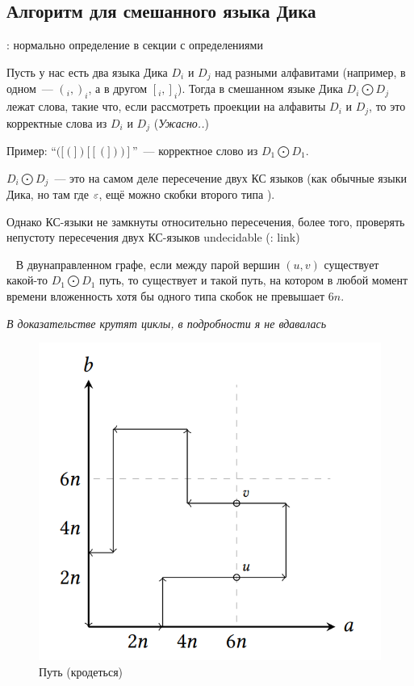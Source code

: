 \subsection{Алгоритм для смешанного языка Дика}

\begin{definition}
    \TODO: нормально определение в секции с определениями

    Пусть у нас есть два языка Дика $D_i$ и $D_j$ над разными алфавитами (например, в одном~--- $(_i, )_i$, а в другом $[_i, ]_i$). Тогда в смешанном языке Дика $D_i \bigodot D_j$ лежат слова, такие что, если рассмотреть проекции на алфавиты $D_i$ и $D_j$, то это корректные слова из $D_i$ и $D_j$ (\textit{Ужасно..})

    Пример: ``$([(])[[(]))]$''~--- корректное слово из $D_1 \bigodot D_1$. 
\end{definition}

\begin{note}
    $D_i \bigodot D_j$~--- это на самом деле пересечение двух КС языков (как обычные языки Дика, но там где $\varepsilon$, ещё можно скобки второго типа \TODO).

    Однако КС-языки не замкнуты относительно пересечения, более того, проверять непустоту пересечения двух КС-языков undecidable (\TODO: link)
\end{note}

\begin{lemma}~\cite{Li21}
    В двунаправленном графе, если между парой вершин $(u, v)$ существует какой-то $D_1 \bigodot D_1$ путь, то существует и такой путь, на котором в любой момент времени вложенность хотя бы одного типа скобок не превышает $6n$.

    \textit{В доказательстве крутят циклы, в подробности я не вдавалась}
\end{lemma}

\begin{figure}[H]
    \includegraphics[width=0.75\linewidth]{img/6n_6n_path.png}
    \caption{Путь (кродеться)}
\end{figure}

